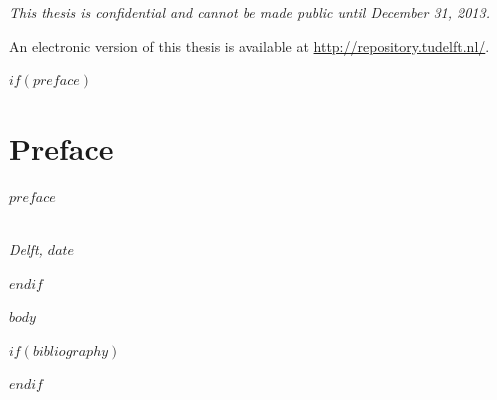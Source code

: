 \documentclass[whitelogo]{tudelft-report}
\begin{document}
\begin{titlepage}
\begin{center}
\bigskip
\bigskip
\emph{This thesis is confidential and cannot be made public until December 31, 2013.}

\bigskip
\bigskip
An electronic version of this thesis is available at \url{http://repository.tudelft.nl/}.



\end{center}


\end{titlepage}

$if(preface)$
\chapter*{Preface}

$preface$

\begin{flushright}
{\makeatletter\itshape
    \@author \\
    Delft, $date$
\makeatother}
\end{flushright}

$endif$

\tableofcontents

\mainmatter

$body$

\appendix

%

\nocite{*}

$if(bibliography)$

$endif$
\end{document}
